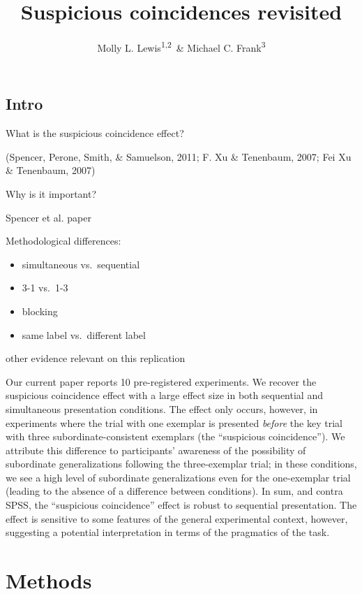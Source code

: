 \documentclass[english,floatsintext,man]{apa6}
\title{Suspicious coincidences revisited}
\author{Molly L. Lewis\textsuperscript{1,2}~\& Michael C. Frank\textsuperscript{3}}
\affiliation{
    \vspace{0.5cm}
          \textsuperscript{1} Computation Institute, University of Chicago\\
          \textsuperscript{2} Department of Psychology, University of Wisconsin, Madison\\
          \textsuperscript{3} Department of Psychology, Stanford University  }
\providecommand{\tightlist}{%
  \setlength{\itemsep}{0pt}\setlength{\parskip}{0pt}}
\theoremstyle{definition}
\theoremstyle{definition}
\theoremstyle{remark}
\begin{document}
\maketitle

\setcounter{secnumdepth}{0}



\subsection{Intro}\label{intro}

What is the suspicious coincidence effect?

(Spencer, Perone, Smith, \& Samuelson, 2011; F. Xu \& Tenenbaum, 2007;
Fei Xu \& Tenenbaum, 2007)

Why is it important?

Spencer et al. paper

Methodological differences:

\begin{itemize}
\tightlist
\item
  simultaneous vs.~sequential
\item
  3-1 vs.~1-3
\item
  blocking
\item
  same label vs.~different label
\end{itemize}

other evidence relevant on this replication

Our current paper reports 10 pre-registered experiments. We recover the
suspicious coincidence effect with a large effect size in both
sequential and simultaneous presentation conditions. The effect only
occurs, however, in experiments where the trial with one exemplar is
presented \emph{before} the key trial with three subordinate-consistent
exemplars (the \enquote{suspicious coincidence}). We attribute this
difference to participants' awareness of the possibility of subordinate
generalizations following the three-exemplar trial; in these conditions,
we see a high level of subordinate generalizations even for the
one-exemplar trial (leading to the absence of a difference between
conditions). In sum, and contra SPSS, the \enquote{suspicious
coincidence} effect is robust to sequential presentation. The effect is
sensitive to some features of the general experimental context, however,
suggesting a potential interpretation in terms of the pragmatics of the
task.

\section{Methods}\label{methods}
\end{document}
